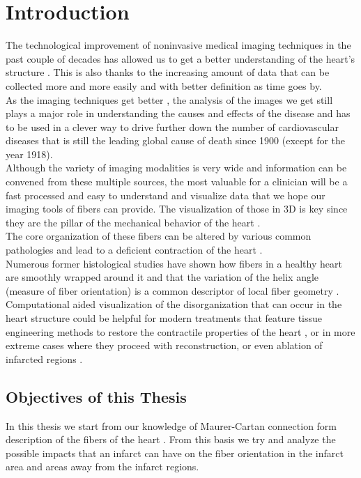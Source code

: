 \chapter{Introduction}

The technological improvement of noninvasive medical imaging techniques in the past couple of decades has allowed us to get a better understanding of the heart's structure \cite{sinusas2008multimodality}. This is also thanks to the increasing amount of data that can be collected more and more easily and with better definition as time goes by. \\
As the imaging techniques get better \cite{shaw2010cardiovascular}, the analysis of the images we get still plays a major role in understanding the causes and effects of the disease and has to be used in a clever way to drive further down the number of cardiovascular diseases that is still the leading global cause of death \cite{mozaffarian2015heart} since 1900 (except for the year 1918). \\
Although the variety of imaging modalities is very wide and information can be convened from these multiple sources, the most valuable for a clinician will be a fast processed and easy to understand and visualize data that we hope our imaging tools of fibers can provide. The visualization of those in 3D is key since they are the pillar of the mechanical behavior of the heart \cite{hooks2002cardiac}.\\
The core organization of these fibers can be altered by various common pathologies and lead to a deficient contraction of the heart \cite{beg2004computational}. \\
Numerous former histological studies have shown how fibers in a healthy heart are smoothly wrapped around it and that the variation of the helix angle (measure of fiber orientation) is a common descriptor of local fiber geometry \cite{geerts2002characterization}. Computational aided visualization of the disorganization that can occur in the heart structure could be helpful for modern treatments that feature tissue engineering methods to restore the contractile properties of the heart \cite{caplan2006mesenchymal,laflamme2007cardiomyocytes,laflamme2005regenerating, song2012heart, zimmermann2004engineered}, or in more extreme cases where they proceed with reconstruction, or even ablation of infarcted regions \cite{athanasuleas2004surgical, di2001effects, jones2009coronary, sartipy2005dor}.

\section{Objectives of this Thesis}

In this thesis we start from our knowledge of Maurer-Cartan connection form description of the fibers of the heart \cite{pami2015}. From this basis we try and analyze the possible impacts that an infarct can have on the fiber orientation in the infarct area and areas away from the infarct regions.